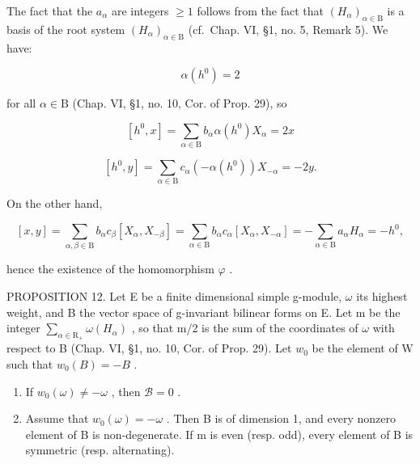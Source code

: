 The fact that the \(a_{\alpha}\) are integers \(\geq 1\) follows from the fact that \((H_{\alpha})_{\alpha \in \mathrm{B}}\) is a basis of the root system \((H_{\alpha})_{\alpha \in \mathrm{B}}\) (cf.~Chap. VI, §1, no. 5, Remark 5). We have:

\[
\alpha (h ^ {0}) = 2\tag{1}
\]

for all \(\alpha \in \mathrm{B}\) (Chap. VI, §1, no. 10, Cor. of Prop. 29), so

\[
[ h ^ {0}, x ] = \sum_ {\alpha \in \mathrm{B}} b _ {\alpha} \alpha (h ^ {0}) X _ {\alpha} = 2 x\tag{2}
\]

\[
[ h ^ {0}, y ] = \sum_ {\alpha \in \mathrm{B}} c _ {\alpha} (- \alpha (h ^ {0})) X _ {- \alpha} = - 2 y.\tag{3}
\]

On the other hand,

\[
[ x, y ] = \sum_ {\alpha , \beta \in \mathrm{B}} b _ {\alpha} c _ {\beta} [ X _ {\alpha}, X _ {- \beta} ] = \sum_ {\alpha \in \mathrm{B}} b _ {\alpha} c _ {\alpha} [ X _ {\alpha}, X _ {- \alpha} ] = - \sum_ {\alpha \in \mathrm{B}} a _ {\alpha} H _ {\alpha} = - h ^ {0},\tag{4}
\]

hence the existence of the homomorphism \(\varphi\) .

PROPOSITION 12. Let E be a finite dimensional simple g-module, \(\omega\) its highest weight, and B the vector space of g-invariant bilinear forms on E. Let m be the integer \(\sum_{\alpha\in\mathrm{R}_{+}}\omega(H_{\alpha})\) , so that m/2 is the sum of the coordinates of \(\omega\) with respect to B (Chap. VI, §1, no. 10, Cor. of Prop. 29). Let \(w_{0}\) be the element of W such that \(w_{0}(B) = -B\) .

\begin{enumerate}
\def\labelenumi{(\roman{enumi})}
\item
  If \(w_0(\omega) \neq -\omega\) , then \(\mathcal{B} = 0\) .
\item
  Assume that \(w_{0}(\omega) = -\omega\) . Then B is of dimension 1, and every nonzero element of B is non-degenerate. If m is even (resp. odd), every element of B is symmetric (resp. alternating).
\end{enumerate}

